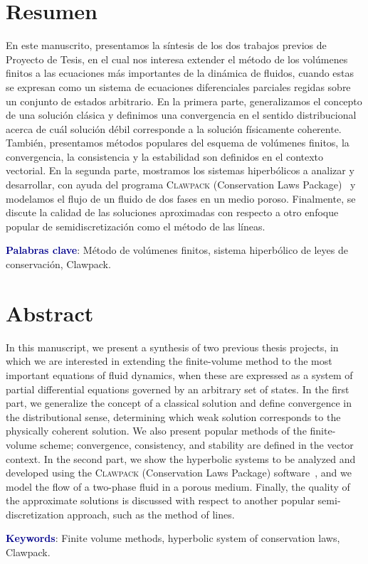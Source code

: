 \chapter*{Resumen}

En este manuscrito, presentamos la síntesis de los dos trabajos
previos de Proyecto de Tesis, en el cual nos interesa extender el
método de los volúmenes finitos a las ecuaciones más importantes de la
dinámica de fluidos, cuando estas se expresan como un sistema de
ecuaciones diferenciales parciales regidas sobre un conjunto de
estados arbitrario.
En la primera parte, generalizamos el concepto de una solución
clásica y definimos una convergencia en el sentido distribucional
acerca de cuál solución débil corresponde a la solución físicamente
coherente.
También, presentamos métodos populares del esquema de volúmenes
finitos, la convergencia, la consistencia y la estabilidad son
definidos en el contexto vectorial.
En la segunda parte, mostramos los sistemas hiperbólicos a analizar
y desarrollar, con ayuda del programa \textsc{Clawpack} (Conservation
Laws Package)~\cite{Clawpack2025,Mandli2016} y modelamos el flujo de
un fluido de dos fases en un medio poroso.
Finalmente, se discute la calidad de las soluciones aproximadas con
respecto a otro enfoque popular de semidiscretización como el método
de las líneas.

\noindent\textcolor{DarkBlue}{\bfseries\sffamily Palabras clave}:
Método de volúmenes finitos, sistema hiperbólico de leyes de
conservación, Clawpack.

\chapter*{Abstract}

In this manuscript, we present a synthesis of two previous thesis
projects, in which we are interested in extending the finite-volume
method to the most important equations of fluid dynamics, when these
are expressed as a system of partial differential equations governed
by an arbitrary set of states.
In the first part, we generalize the concept of a classical solution
and define convergence in the distributional sense, determining which
weak solution corresponds to the physically coherent solution.
We also present popular methods of the finite-volume scheme;
convergence, consistency, and stability are defined in the vector
context.
In the second part, we show the hyperbolic systems to be analyzed and
developed using the \textsc{Clawpack} (Conservation Laws Package)
software~\cite{Clawpack2025,Mandli2016}, and we model the flow of a
two-phase fluid in a porous medium.
Finally, the quality of the approximate solutions is discussed with
respect to another popular semi-discretization approach, such as the
method of lines.

\noindent\textcolor{DarkBlue}{\bfseries\sffamily Keywords}:
Finite volume methods, hyperbolic system of conservation laws,
Clawpack.
